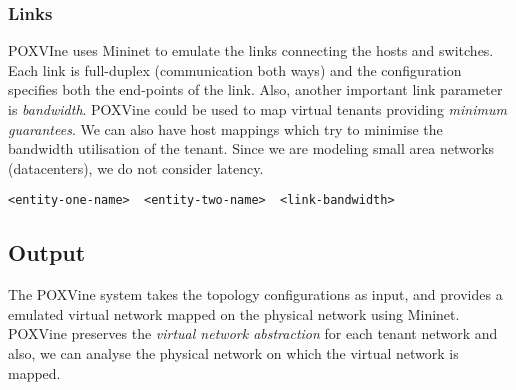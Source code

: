 \subsubsection{Links}
POXVIne uses Mininet to emulate the links connecting the hosts and switches. Each link is full-duplex (communication both ways) and the configuration specifies both the end-points of the link. Also, another important link parameter is \emph{bandwidth}. POXVine could be used to map virtual tenants providing \emph{minimum guarantees}. We can also have host mappings which try to minimise the bandwidth utilisation of the tenant. Since we are modeling small area networks (datacenters), we do not consider latency.
\begin{verbatim}
<entity-one-name>  <entity-two-name>  <link-bandwidth>  
\end{verbatim}

\subsection{Output}
The POXVine system takes the topology configurations as input, and provides a emulated virtual network mapped on the physical network using Mininet. POXVine preserves the \emph{virtual network abstraction} for each tenant network and also, we can analyse the physical network on which the virtual network is mapped.



